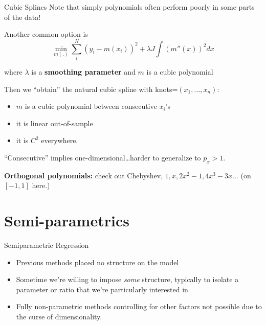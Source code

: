 \begin{frame}{Cubic Splines}
  Note that simply polynomials often perform poorly in some parts of the data! 

Another common option is 
\[
\min_{m(.)} \sum_i^N (y_i-m(x_i))^2 +\lambda J \int (m''(x))^2 dx 
\]

where $\lambda$ is a \textbf{smoothing parameter} and $m$ is a cubic polynomial 

Then we ``obtain'' the natural cubic spline with knots=$(x_1,\ldots,x_n)$:

\begin{itemize}[<+->]
\item $m$ is a cubic polynomial between consecutive $x_i$'s
\item it is linear out-of-sample
\item it is $C^2$ everywhere. 
\end{itemize}

\pause

``Consecutive'' implies one-dimensional\ldots harder to generalize to
$p_x>1$.

\pause

\textbf{Orthogonal polynomials:} check out Chebyshev, $1, x,
2x^2-1,4x^3-3x\ldots$ (on $[-1,1]$ here.)

\end{frame}



\section{Semi-parametrics}

\begin{frame}{Semiparametric Regression}
  \begin{itemize}
    \item Previous methods placed no structure on the model
    \item Sometime we're willing to impose \textit{some} structure, typically to isolate a parameter or ratio that we're particularly interested in
    \item Fully non-parametric methods controlling for other factors not possible due to the curse of dimensionality. 
  \end{itemize}
\end{frame}

